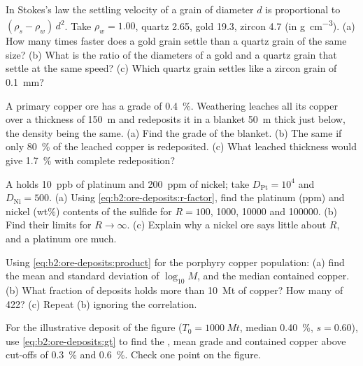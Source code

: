 \begin{exercise}[$\star$]\label{exo:b2:ore-deposits:3}
In Stokes's law the settling velocity of a grain of diameter $d$ is proportional to $(\rho_s -
\rho_w)\,d^2$. Take $\rho_w = 1.00$, quartz 2.65, gold 19.3, zircon 4.7 (in
\unit{g.cm^{-3}}). (a) How many times faster does a gold grain settle than a quartz grain of the
same size? (b) What is the ratio of the diameters of a gold and a quartz grain that settle at the
same speed? (c) Which quartz grain settles like a zircon grain of \qty{0.1}{mm}?
\end{exercise}

\begin{exercise}[$\star$]\label{exo:b2:ore-deposits:4}
A primary copper ore has a grade of \qty{0.4}{\percent}. Weathering leaches all its copper over a
thickness of \qty{150}{m} and redeposits it in a blanket \qty{50}{m} thick just below, the density
being the same. (a) Find the grade of the blanket. (b) The same if only \qty{80}{\percent} of the
leached copper is redeposited. (c) What leached thickness would give \qty{1.7}{\percent} with
complete redeposition?
\end{exercise}

\begin{exercise}[$\star\star$]\label{exo:b2:ore-deposits:5}
A  holds \qty{10}{ppb} of platinum and \qty{200}{ppm} of nickel; take $D_{\mathrm{Pt}} =
10^4$ and $D_{\mathrm{Ni}} = 500$. (a) Using \eqref{eq:b2:ore-deposits:r-factor}, find the
platinum (ppm) and nickel (wt\%) contents of the sulfide for $R = 100$, \num{1000}, \num{10000}
and \num{100000}. (b) Find their limits for $R \to \infty$. (c) Explain why a nickel ore says
little about $R$, and a platinum ore much.
\end{exercise}

\begin{exercise}[$\star\star$]\label{exo:b2:ore-deposits:6}
Using \eqref{eq:b2:ore-deposits:product} for the porphyry copper population: (a) find the mean and
standard deviation of $\log_{10} M$, and the median contained copper. (b) What fraction of deposits
holds more than \qty{10}{Mt} of copper? How many of 422? (c) Repeat (b) ignoring the correlation.
\end{exercise}

\begin{exercise}[$\star\star$]\label{exo:b2:ore-deposits:7}
For the illustrative deposit of the figure ($T_0 = \qty{1000}{Mt}$, median \qty{0.40}{\percent},
$s = 0.60$), use \eqref{eq:b2:ore-deposits:gt} to find the , mean grade and contained copper
above cut-offs of \qty{0.3}{\percent} and \qty{0.6}{\percent}. Check one point on the figure.
\end{exercise}

